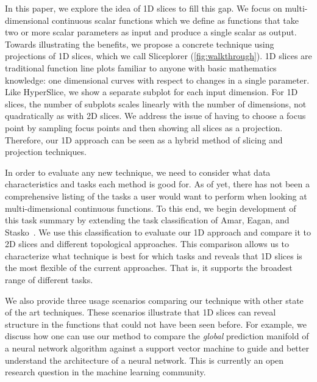 
In this paper, we explore the idea of 1D slices to fill this gap. We focus on 
multi-dimensional continuous scalar functions which we define as functions that take two or more
scalar parameters as input and produce a single scalar as output.
Towards illustrating the benefits, we propose a concrete technique using projections of 1D slices, which we call Sliceplorer (\autoref{fig:walkthrough}). 
1D slices are traditional function line plots familiar to anyone with
basic mathematics knowledge: one dimensional curves with respect to
changes in a single parameter. 
Like HyperSlice, we show a separate subplot
for each input dimension. For 1D slices, the number of
subplots scales linearly with the number of dimensions, not quadratically as with 2D slices. We address the issue of having to choose a focus
point by sampling focus points and then showing all slices as a
projection. Therefore, our 1D approach can be seen as a hybrid method of slicing
and projection techniques. %

In order to evaluate any new technique, we need to
consider what data characteristics and tasks each method is good for. As of yet, there has not been a comprehensive
listing of the tasks a user would want to perform when looking at
multi-dimensional continuous functions. To this
end, we begin development of this task summary by extending the task classification of Amar, Eagan, and Stasko~\cite{Amar:2005}. We use this classification to evaluate our 1D approach and compare it to 2D slices and different topological approaches. This comparison allows us to characterize what technique is best for which tasks and reveals that 1D slices is the most flexible of the current approaches. That is, it supports the broadest range of different tasks.

We also provide three usage scenarios comparing our technique with other state of the art techniques. These scenarios illustrate that 1D
slices can reveal structure in the functions that could not
have been seen before. For example, we discuss how one can use our
method to compare the \emph{global} prediction manifold of a neural
network algorithm against a support vector machine to guide and better understand the architecture of a neural network. This is currently an open research question in the machine learning community.

